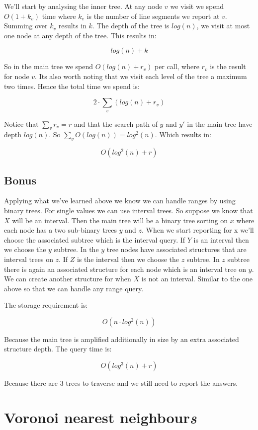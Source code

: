 \documentclass{article}
\begin{document}
We'll start by analysing the inner tree.
At any node $v$ we visit we spend $O(1+k_v)$ time where
$k_v$ is the number of line segments we report at $v$. Summing
over $k_v$ results in $k$. The depth of the tree is $log(n)$,
we visit at most one node at any depth of the tree. This results in:

\[ log(n)+k\]

So in the main tree we spend $O(log(n)+r_v)$ per call, where $r_v$ is
the result for node $v$. Its also worth noting that we visit each level
of the tree a maximum two times. Hence the total time we spend is:

\[ 2\cdot \sum_v(log(n)+r_v)\]

Notice that $\sum_v r_v = r$ and that the search path of $y$ and $y'$
in the main tree have depth $log(n)$. So $\sum_v O(log(n))=log^2(n)$.
Which results in:

\[ O(log^2(n)+r) \]

\subsection{Bonus}
Applying what we've learned above we know we can handle ranges by using
binary trees. For single values we can use interval trees.
So suppose we know that $X$ will be an interval. Then the main tree will
be a binary tree sorting on $x$ where each node has a two sub-binary trees $y$
and $z$.
When we start reporting for x we'll choose the associated subtree which
is the interval query.
If $Y$ is an interval then we choose the $y$ subtree.
In the $y$ tree nodes have associated structures that are interval trees
on $z$.
If $Z$ is the interval then we choose the $z$ subtree. In $z$ subtree
there is again an associated structure for each node which is an interval
tree on $y$.
We can create another structure for when $X$ is not an interval. Similar
to the one above so that we can handle any range query.

The storage requirement is:

\[O(n\cdot log^2(n))\]

Because the main tree is amplified additionally in size by an extra associated
structure depth.
The query time is:

\[ O(log^3(n)+r) \]

Because there are 3 trees to traverse and we still need to report the answers.
\section{Voronoi nearest neighbour\emph{s}}
\end{document}
